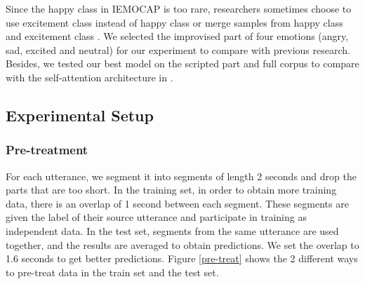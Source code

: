 \documentclass[10pt, conference, compsocconf]{IEEEtran}
\begin{document}
Since the happy class in IEMOCAP is too rare, researchers sometimes choose to use excitement class instead of happy class \cite{tarantino2019self,chernykh2017emotion} or merge samples from happy class and excitement class \cite{zhao2019attention,neumann2019improving}. We selected the improvised part of four emotions (angry, sad, excited and neutral) for our experiment to compare with previous research. Besides, we
tested our best model on the scripted part and full corpus to compare with the self-attention architecture in \cite{tarantino2019self}.
 
\subsection{Experimental Setup}
\subsubsection{Pre-treatment}
For each utterance, we segment it into segments of length 2 seconds and drop the parts that are too short. In the training set, in order to obtain more training data, there is an overlap of 1 second between each segment. These segments are given the label of their source utterance and participate in training as independent data. In the test set, segments from the same utterance are used together, and the results are averaged to obtain predictions. We set the overlap to 1.6 seconds to get better predictions.
Figure \ref{pre-treat} shows the 2 different ways to pre-treat data in the train set and the test set.
\end{document}
